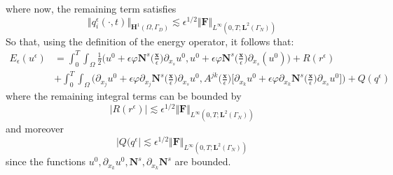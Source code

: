 where now, the remaining term satisfies 
\begin{equation*}
    \Vert q^{\epsilon}_i(\cdot, t) \Vert_{\mathbf{H}^1(\Omega, \Gamma_D)} \lesssim \epsilon^{1/2} \Vert \mathbf{F}\Vert_{L^{\infty}(0,T; \mathbf{L}^{2}(\Gamma_N))}
\end{equation*}
So that, using the definition of the energy operator, it follows that:
\begin{align*}
    E_{\epsilon}(u^{\epsilon}) &= \int_0^T \int_{\Omega} \frac{1}{2}(u^0 + \epsilon \varphi \mathbf{N}^s \big( \frac{\mathbf{x}}{\epsilon} \big) \partial_{x_s} u^0, u^0 + \epsilon \varphi \mathbf{N}^s \big( \frac{\mathbf{x}}{\epsilon} \big) \partial_{x_s} (u^0) \big) + R(r^{\epsilon}) \\
    & + \int_0^T \int_{\Omega} \big( \partial_{x_j} u^0 + \epsilon \varphi \partial_{x_j} \mathbf{N}^s \big( \frac{\mathbf{x}}{\epsilon} \big) \partial_{x_s} u^0, A^{jk} \big(\frac{\mathbf{x}}{\epsilon} \big) \big[\partial_{x_k} u^0 + \epsilon \varphi \partial_{x_k} \mathbf{N}^s \big( \frac{\mathbf{x}}{\epsilon}\big) \partial_{x_s} u^0 \big] \big) + Q(q^{\epsilon})
\end{align*}
where the remaining integral terms can be bounded by
\begin{equation*}
    \vert R(r^{\epsilon}) \vert \lesssim \epsilon^{1/2} \Vert \mathbf{F}\Vert_{L^{\infty}(0,T;\mathbf{L}^{2}(\Gamma_N))} 
\end{equation*}
and moreover
\begin{equation*}
    \vert Q(q^{\epsilon} \vert \lesssim \epsilon^{1/2} \Vert \mathbf{F}\Vert_{L^{\infty}(0,T;\mathbf{L}^{2}(\Gamma_N))}
\end{equation*}
since the functions $u^0, \partial_{x_k}u^0, \mathbf{N}^s, \partial_{x_k} \mathbf{N}^s$ are bounded.



